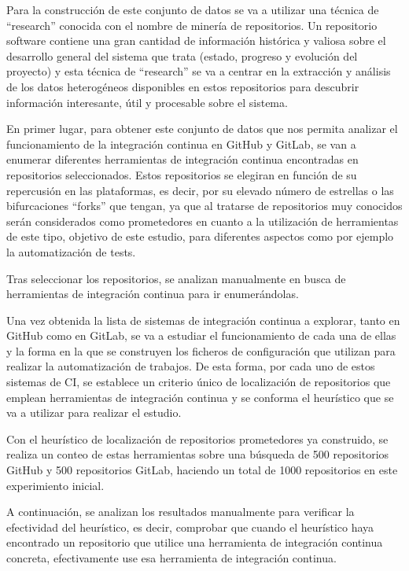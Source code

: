 Para la construcción de este conjunto de datos se va a utilizar una técnica de ``research'' conocida con el nombre de minería de repositorios.
Un repositorio software contiene una gran cantidad de información histórica y valiosa sobre el desarrollo general del sistema que trata (estado, progreso y evolución del proyecto) y esta técnica de ``research'' se va a centrar en la extracción y análisis de los datos heterogéneos disponibles en estos repositorios para descubrir información interesante, útil y procesable sobre el sistema.

En primer lugar, para obtener este conjunto de datos que nos permita analizar el funcionamiento de la integración continua en GitHub y GitLab, se van a enumerar diferentes herramientas de integración continua encontradas en repositorios seleccionados. 
Estos repositorios se elegiran en función de su repercusión en las plataformas, es decir, por su elevado número de estrellas o las bifurcaciones ``forks'' que tengan, ya que al tratarse de repositorios muy conocidos serán considerados como prometedores en cuanto a la utilización de herramientas de este tipo, objetivo de este estudio, para diferentes aspectos como por ejemplo la automatización de tests.

Tras seleccionar los repositorios, se analizan manualmente en busca de herramientas de integración continua para ir enumerándolas.

Una vez obtenida la lista de sistemas de integración continua a explorar, tanto en GitHub como en GitLab, se va a estudiar el funcionamiento de cada una de ellas y la forma en la que se construyen los ficheros de configuración que utilizan para realizar la automatización de trabajos. De esta forma, por cada uno de estos sistemas de CI, se establece un criterio único de localización de repositorios que emplean herramientas de integración continua y se conforma el heurístico que se va a utilizar para realizar el estudio.

Con el heurístico de localización de repositorios prometedores ya construido, se realiza un conteo de estas herramientas sobre una búsqueda de 500 repositorios GitHub y 500 repositorios GitLab, haciendo un total de 1000 repositorios en este experimiento inicial.

A continuación, se analizan los resultados manualmente para verificar la efectividad del heurístico, es decir, comprobar que cuando el heurístico haya encontrado un repositorio que utilice una herramienta de integración continua concreta, efectivamente use esa herramienta de integración continua.


